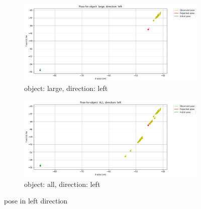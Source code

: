\documentclass[10pt,a4paper]{article}
\begin{document}
\begin{itemize}
\begin{figure}[H]
									\begin{subfigure}{0.5\textwidth}
										\centering
										\includegraphics[width=0.8\linewidth]{img/pose_large_left.png}
										\caption{object: large, direction: left}
										\label{fig:object: large, direction: left}
									\end{subfigure}%
									\begin{subfigure}{0.5\textwidth}
										\centering
										\includegraphics[width=0.8\linewidth]{img/pose_all_left.png}
										\caption{object: all, direction: left}
										\label{fig:object: all, direction: left}
									\end{subfigure}
									
									\caption{pose in left direction}
									\label{fig:pose in left direction}
								\end{figure}
								

\end{itemize}
\end{document}

